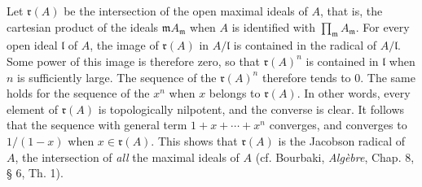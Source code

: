 Let $\mathfrak r(A)$ be the intersection of the open maximal ideals of $A$, that is, the cartesian product of the ideals $\mathfrak m A_{\mathfrak m}$ when $A$ is identified with $\prod_{\mathfrak m}A_{\mathfrak m}$. For every open ideal $\mathfrak l$ of $A$, the image of $\mathfrak r(A)$ in $A/\mathfrak l$ is contained in the radical of $A/\mathfrak l$. Some power of this image is therefore zero, so that $\mathfrak r(A)^n$ is contained in $\mathfrak l$ when $n$ is sufficiently large. The sequence of the $\mathfrak r(A)^n$ therefore tends to $0$.
The same holds for the sequence of the $x^n$ when $x$ belongs to $\mathfrak r(A)$. In other words, every element of $\mathfrak r(A)$ is topologically nilpotent, and the converse is clear. It follows that the sequence with general term $1+x+\cdots+x^n$ converges, and converges to $1/(1-x)$ when $x\in\mathfrak r(A)$. This shows that $\mathfrak r(A)$ is the Jacobson radical of $A$, \ie the intersection of \emph{all} the maximal ideals of $A$ (cf. Bourbaki, \textit{Algèbre}, Chap. 8, § 6, Th. 1).

